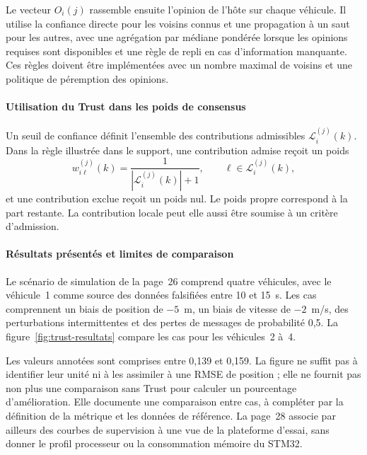 Le vecteur $O_i(j)$ rassemble ensuite l'opinion de l'hôte sur chaque véhicule. Il utilise la confiance directe pour les voisins connus et une propagation à un saut pour les autres, avec une agrégation par médiane pondérée lorsque les opinions requises sont disponibles et une règle de repli en cas d'information manquante. Ces règles doivent être implémentées avec un nombre maximal de voisins et une politique de péremption des opinions.

\paragraph{Utilisation du Trust dans les poids de consensus}
Un seuil de confiance définit l'ensemble des contributions admissibles $\mathcal{L}_i^{(j)}(k)$. Dans la règle illustrée dans le support, une contribution admise reçoit un poids
\begin{equation}
w_{i\ell}^{(j)}(k)=\frac{1}{|\mathcal{L}_i^{(j)}(k)|+1},
\qquad \ell\in\mathcal{L}_i^{(j)}(k),
\end{equation}
et une contribution exclue reçoit un poids nul. Le poids propre correspond à la part restante. La contribution locale peut elle aussi être soumise à un critère d'admission. 


\paragraph{Résultats présentés et limites de comparaison}
Le scénario de simulation de la page~26 comprend quatre véhicules, avec le véhicule~1 comme source des données falsifiées entre 10 et 15~s. Les cas comprennent un biais de position de $-5$~m, un biais de vitesse de $-2$~m/s, des perturbations intermittentes et des pertes de messages de probabilité 0,5. La figure~\ref{fig:trust-resultats} compare les cas pour les véhicules~2 à~4.


Les valeurs annotées sont comprises entre 0,139 et 0,159. La figure ne suffit pas à identifier leur unité ni à les assimiler à une RMSE de position ; elle ne fournit pas non plus une comparaison sans Trust pour calculer un pourcentage d'amélioration. Elle documente une comparaison entre cas, à compléter par la définition de la métrique et les données de référence. La page~28 associe par ailleurs des courbes de supervision à une vue de la plateforme d'essai, sans donner le profil processeur ou la consommation mémoire du STM32.

